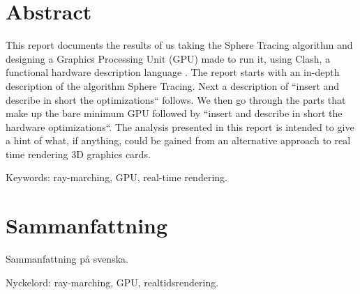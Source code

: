\thispagestyle{plain}			%
\setlength{\parskip}{0pt plus 1.0pt}
\section*{Abstract}

	This report documents the results of us taking the Sphere Tracing algorithm
	and designing a Graphics Processing Unit (GPU) made to run it, using Clash, 
	a functional hardware description language .\cite{Raa2015a} The report 
	starts with an in-depth description of the algorithm Sphere Tracing. 
	Next a description of ``insert and describe in short the optimizations`` 
	follows. We then go through the parts that make up the 
	bare minimum GPU followed by ``insert and describe in short the hardware 
	optimizations``. The analysis presented in this report is intended to give 
	a hint of what,	if anything, could be gained from an alternative approach 
	to real time rendering 3D graphics cards.

	\vfill
	Keywords: ray-marching, GPU, real-time rendering.

\newpage
\thispagestyle{plain}

\section*{Sammanfattning}
	
	Sammanfattning på svenska.
	
	\vfill
	Nyckelord: ray-marching, GPU, realtidsrendering.


\newpage
\thispagestyle{empty}
\mbox{}
